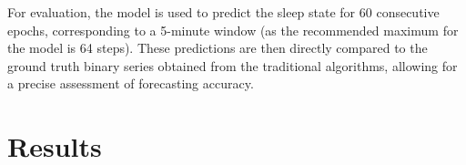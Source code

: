 \documentclass[conference]{IEEEtran}
\begin{document}
For evaluation, the model is used to predict the sleep state for 60 consecutive epochs, corresponding to a 5-minute window (as the recommended maximum for the model is 64 steps). These predictions are then directly compared to the ground truth binary series obtained from the traditional algorithms, allowing for a precise assessment of forecasting accuracy.

\section{Results}





\end{document}
